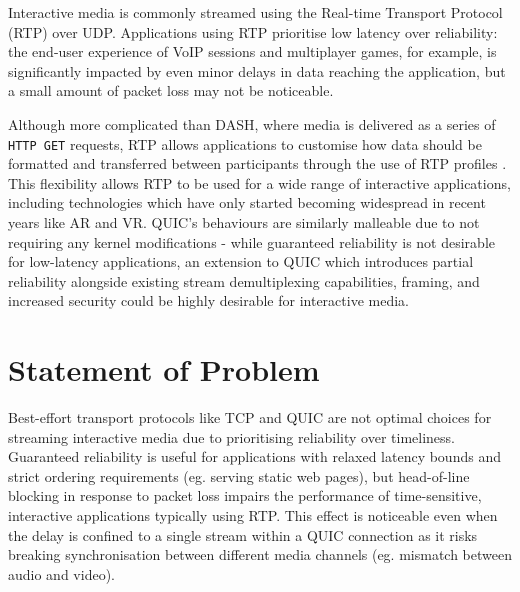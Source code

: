 \documentclass{mprop}
\begin{document}
Interactive media is commonly streamed using the Real-time Transport Protocol (RTP) over UDP. Applications using RTP prioritise low latency over reliability: the end-user experience of VoIP sessions and multiplayer games, for example, is significantly impacted by even minor delays in data reaching the application, but a small amount of packet loss may not be noticeable.

Although more complicated than DASH, where media is delivered as a series of \texttt{HTTP GET} requests, RTP allows applications to customise how data should be formatted and transferred between participants through the use of RTP profiles \cite{RTP-RFC}. This flexibility allows RTP to be used for a wide range of interactive applications, including technologies which have only started becoming widespread in recent years like AR and VR. QUIC's behaviours are similarly malleable due to not requiring any kernel modifications - while guaranteed reliability is not desirable for low-latency applications, an extension to QUIC which introduces partial reliability alongside existing stream demultiplexing capabilities, framing, and increased security could be highly desirable for interactive media.



\newpage

\section{Statement of Problem}


Best-effort transport protocols like TCP and QUIC are not optimal choices for streaming interactive media due to prioritising reliability over timeliness. Guaranteed reliability is useful for applications with relaxed latency bounds and strict ordering requirements (eg. serving static web pages), but head-of-line blocking in response to packet loss impairs the performance of time-sensitive, interactive applications typically using RTP. This effect is noticeable even when the delay is confined to a single stream within a QUIC connection as it risks breaking synchronisation between different media channels (eg. mismatch between audio and video).
\end{document}
